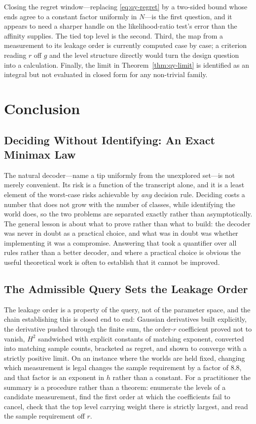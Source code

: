 \documentclass[conference]{IEEEtran}
\theoremstyle{definition}
\begin{document}
Closing the regret window---replacing \eqref{eq:qy-regret} by a two-sided bound whose ends agree
to a constant factor uniformly in $N$---is the first question, and it appears to need a
sharper handle on the likelihood-ratio test's error than the affinity supplies. The tied top
level is the second. Third, the map from a measurement to its leakage order is currently
computed case by case; a criterion reading $r$ off $g$ and the level structure directly would
turn the design question into a calculation. Finally, the limit in
Theorem~\ref{thm:qy-limit} is identified as an integral but not evaluated in closed form for any
non-trivial family.


\section{Conclusion}

\subsection{Deciding Without Identifying: An Exact Minimax Law}

The natural decoder---name a tip uniformly from the unexplored set---is not merely convenient.
Its risk is a function of the transcript alone, and it is a least element of the worst-case
risks achievable by \emph{any} decision rule. Deciding costs a number that does not grow with
the number of classes, while identifying the world does, so the two problems are separated
exactly rather than asymptotically. The general lesson is about what to prove rather than what
to build: the decoder was never in doubt as a practical choice, and what was in doubt was
whether implementing it was a compromise. Answering that took a quantifier over all rules
rather than a better decoder, and where a practical choice is obvious the useful theoretical
work is often to establish that it cannot be improved.



\subsection{The Admissible Query Sets the Leakage Order}

The leakage order is a property of the query, not of the parameter space, and the chain
establishing this is closed end to end: Gaussian derivatives built explicitly, the derivative
pushed through the finite sum, the order-$r$ coefficient proved not to vanish, $H^{2}$
sandwiched with explicit constants of matching exponent, converted into matching sample
counts, bracketed as regret, and shown to converge with a strictly positive limit. On an
instance where the worlds are held fixed, changing which measurement is legal changes the
sample requirement by a factor of $8.8$, and that factor is an exponent in $h$ rather than a
constant. For a practitioner the summary is a procedure rather than a theorem: enumerate the
levels of a candidate measurement, find the first order at which the coefficients fail to
cancel, check that the top level carrying weight there is strictly largest, and read the
sample requirement off $r$.
\end{document}
